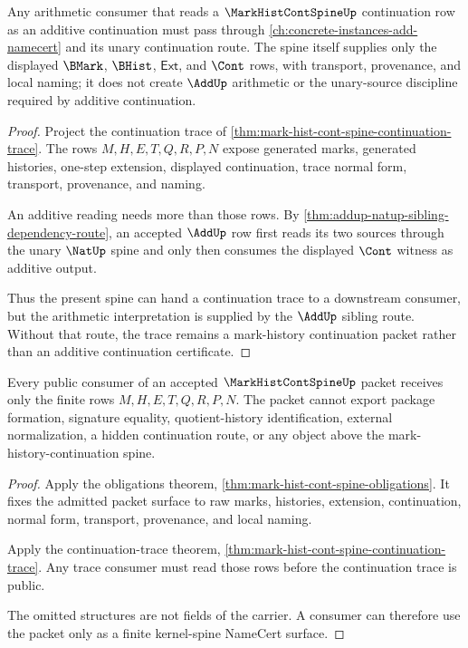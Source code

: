\begin{theorem}
\label{thm:mark-hist-cont-spine-add-cont-dependency}
Any arithmetic consumer that reads a $\MarkHistContSpineUp$ continuation row as an additive continuation must pass through \autoref{ch:concrete-instances-add-namecert} and its unary continuation route. The spine itself supplies only the displayed $\BMark$, $\BHist$, $\mathsf{Ext}$, and $\Cont$ rows, with transport, provenance, and local naming; it does not create $\AddUp$ arithmetic or the unary-source discipline required by additive continuation.
\end{theorem}
\begin{proof}
Project the continuation trace of \autoref{thm:mark-hist-cont-spine-continuation-trace}. The rows $M,H,E,T,Q,R,P,N$ expose generated marks, generated histories, one-step extension, displayed continuation, trace normal form, transport, provenance, and naming.

An additive reading needs more than those rows. By \autoref{thm:addup-natup-sibling-dependency-route}, an accepted $\AddUp$ row first reads its two sources through the unary $\NatUp$ spine and only then consumes the displayed $\Cont$ witness as additive output.

Thus the present spine can hand a continuation trace to a downstream consumer, but the arithmetic interpretation is supplied by the $\AddUp$ sibling route. Without that route, the trace remains a mark-history continuation packet rather than an additive continuation certificate.
\end{proof}

\begin{theorem}
\label{thm:mark-hist-cont-spine-nonescape}
Every public consumer of an accepted $\MarkHistContSpineUp$ packet receives only the finite rows $M,H,E,T,Q,R,P,N$. The packet cannot export package formation, signature equality, quotient-history identification, external normalization, a hidden continuation route, or any object above the mark-history-continuation spine.
\end{theorem}
\begin{proof}
Apply the obligations theorem, \autoref{thm:mark-hist-cont-spine-obligations}. It fixes the admitted packet surface to raw marks, histories, extension, continuation, normal form, transport, provenance, and local naming.

Apply the continuation-trace theorem, \autoref{thm:mark-hist-cont-spine-continuation-trace}. Any trace consumer must read those rows before the continuation trace is public.

The omitted structures are not fields of the carrier. A consumer can therefore use the packet only as a finite kernel-spine NameCert surface.
\end{proof}

